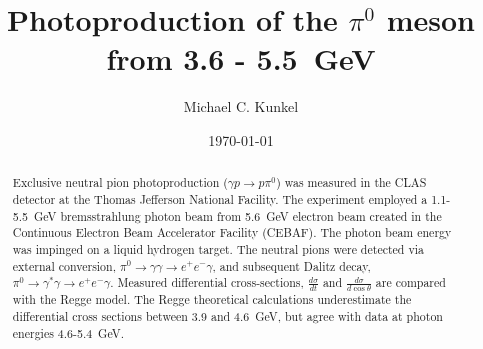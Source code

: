 \documentclass[%
 reprint,
showpacs,
 amsmath,amssymb,
 aps,
]{revtex4-1}
\begin{document}
	\title{Photoproduction of the $\pi^0$ meson from 3.6 - 5.5~GeV }%
	\author{Michael C. Kunkel}
	\date{\today}
	\begin{abstract}
		Exclusive neutral pion photoproduction ($\gamma p \rightarrow p \pi^0$) was measured in the CLAS detector at the Thomas Jefferson National Facility. The experiment employed a 1.1-5.5~GeV bremsstrahlung photon beam from 5.6~GeV electron beam created in the Continuous Electron Beam Accelerator Facility (CEBAF). The photon beam energy was impinged on a liquid hydrogen target. The neutral pions were detected via external conversion, $\pi^0 \rightarrow \gamma \gamma \rightarrow e^+e^-\gamma$, and subsequent Dalitz decay, $\pi^0 \rightarrow \gamma^* \gamma \rightarrow e^+e^-\gamma$. Measured differential cross-sections, $\frac{d\sigma}{dt}$ and $\frac{d\sigma}{d\cos \theta}$ are compared with the Regge model. The Regge theoretical calculations underestimate the differential cross sections between 3.9 and 4.6~GeV, but agree with data at photon energies 4.6-5.4~GeV.
	\end{abstract}
	\maketitle
\end{document}
